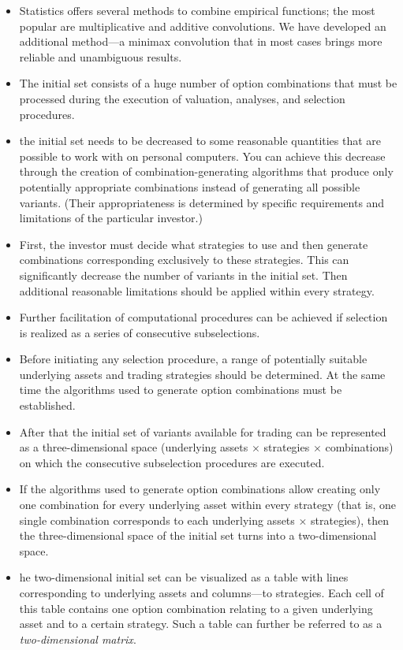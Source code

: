 \begin{itemize}
            \item Statistics offers several methods to combine empirical functions; the most popular are multiplicative and additive convolutions. We have developed an additional method—a minimax convolution that in most cases brings more reliable and unambiguous results.
            \item The initial set consists of a huge number of option combinations that must be processed during the execution of valuation, analyses, and selection procedures.
            \item the initial set needs to be decreased to some reasonable quantities that are possible to work with on personal computers. You can achieve this decrease through the creation of combination-generating algorithms that produce only potentially appropriate combinations instead of generating all possible variants. (Their appropriateness is determined by specific requirements and limitations of the particular investor.)
            \item First, the investor must decide what strategies to use and then generate combinations corresponding exclusively to these strategies. This can significantly decrease the number of variants in the initial set. Then additional reasonable limitations should be applied within every strategy.
            \item Further facilitation of computational procedures can be achieved if selection is realized as a series of consecutive subselections.
            \item Before initiating any selection procedure, a range of potentially suitable underlying assets and trading strategies should be determined. At the same time the algorithms used to generate option combinations must be established.
            \item After that the initial set of variants available for trading can be represented as a three-dimensional space ({underlying assets $\times$ strategies $\times$ combinations}) on which the consecutive subselection procedures are executed.
            \item If the algorithms used to generate option combinations allow creating only one combination for every underlying asset within every strategy (that is, one single combination corresponds to each {underlying assets $\times$ strategies}), then the three-dimensional space of the initial set turns into a two-dimensional space.
            \item he two-dimensional initial set can be visualized as a table with lines corresponding to underlying assets and columns—to strategies. Each cell of this table contains one option combination relating to a given underlying asset and to a certain strategy. Such a table can further be referred to as a \textit{two-dimensional matrix}.

\end{itemize}
